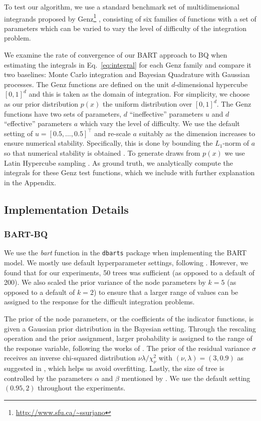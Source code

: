 To test our algorithm, we use a standard benchmark set of multidimensional integrands proposed by Genz\footnote{\url{http://www.sfu.ca/~ssurjano}} \cite{Genz}, consisting of six families of functions with a set of parameters which can be varied to vary the level of difficulty of the integration problem. 

We examine the rate of convergence of our BART approach to BQ  when estimating the integrals in Eq.~\eqref{eq:integral} for each Genz family and compare it two baselines: Monte Carlo integration and Bayesian Quadrature with Gaussian processes. The Genz functions are defined on the unit $d$-dimensional hypercube $[0, 1]^d$ and this is taken as the domain of integration. For simplicity, we choose as our prior distribution $p(x)$ the uniform distribution over $[0, 1]^d$. The Genz functions have two sets of parameters, $d$ ``ineffective'' parameters $u$ and $d$ ``effective'' parameters $a$ which vary the level of difficulty. We use the default setting of $u = [0.5, \ldots, 0.5]^{\top}$ and re-scale $a$ suitably as the dimension increases to ensure numerical stability. Specifically, this is done by bounding the $L_1$-norm of $a$ so that numerical stability is obtained \cite{rescallingGenz}. To generate draws from $p(x)$ we use Latin Hypercube sampling \cite{Press:2007:NRE:1403886}. As ground truth, we analytically compute the integrals for these Genz test functions, which we include with further explanation in the Appendix. 

\subsection{Implementation Details}
\subsubsection{BART-BQ}
We use the \textit{bart} function in the \texttt{dbarts} package \cite{R} when implementing the BART model. We mostly use default hyperparameter settings, following \cite{BART}. However, we found that for our experiments, 50 trees was sufficient (as opposed to a default of 200). We also scaled the prior variance of the node parameters by $k=5$ (as opposed to a default of $k=2$) to ensure that a larger range of values can be assigned to the response for the difficult integration problems.

The prior of the node parameters, or the coefficients of the indicator functions, is given a Gaussian prior distribution in the Bayesian setting. Through the rescaling operation and the prior assignment, larger probability is assigned to the range of the response variable, following the works of \cite{BART}. The prior of the residual variance $\sigma$  receives an inverse chi-squared distribution $\nu\lambda/\chi^2_\nu$ with $(\nu, \lambda) = (3, 0.9)$ as suggested in \cite{BART}, which helps us avoid overfitting. Lastly, the size of tree is controlled by the parameters $\alpha$ and $\beta$ mentioned by \cite{CART}. We use the default setting $(0.95, 2)$ throughout the experiments.

